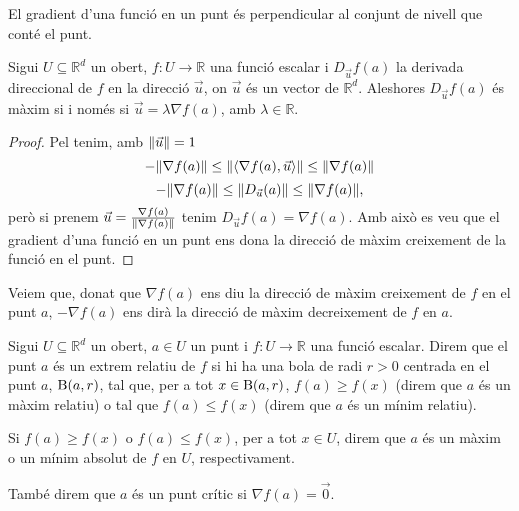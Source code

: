 \documentclass[../Apunts.tex]{subfiles}
\begin{document}
	\begin{observation}\label{obs:gradient ortogonal}
		El gradient d'una funció en un punt és perpendicular al conjunt de nivell que conté el punt.%
	\end{observation}
	\begin{proposition}
		Sigui \(U\subseteq\mathbb{R}^{d}\) un obert, \(f\colon U\to\mathbb{R}\) una funció escalar i \(D_{\vec{u}}f(a)\) la derivada direccional de \(f\) en la direcció \(\vec{u}\), on \(\vec{u}\) és un vector de \(\mathbb{R}^{d}\). Aleshores \(D_{\vec{u}}f(a)\) és màxim si i només si \(\vec{u}=\lambda\nabla f(a)\), amb \(\lambda\in\mathbb{R}\).
		\begin{proof}
			Pel  tenim, amb \(\norm{\vec{u}}=1\)
			\[-\norm{\nabla f(a)}\leq\norm{\langle\nabla f(a),\vec{u}\rangle}\leq\norm{\nabla f(a)}\]
			\[-\norm{\nabla f(a)}\leq\norm{D_{\vec{u}}(a)}\leq\norm{\nabla f(a)},\]
			però si prenem \(\vec{u}=\frac{\nabla f(a)}{\norm{\nabla f(a)}}\) tenim \(D_{\vec{u}}f(a)=\nabla f(a)\). Amb això es veu que el gradient d'una funció en un punt ens dona la direcció de màxim creixement de la funció en el punt.
		\end{proof}
	\end{proposition}
	\begin{observation}
		Veiem que, donat que \(\nabla f(a)\) ens diu la direcció de màxim creixement de \(f\) en el punt \(a\), \(-\nabla f(a)\) ens dirà la direcció de màxim decreixement de \(f\) en \(a\).
	\end{observation}
	\begin{definition}
		\label{def:extrems relatius}
		\label{punts crítics}
		Sigui \(U\subseteq\mathbb{R}^{d}\) un obert, \(a\in U\) un punt i \(f\colon U\to\mathbb{R}\) una funció escalar. Direm que el punt \(a\) és un extrem relatiu de \(f\) si hi ha una bola de radi \(r>0\) centrada en el punt \(a\), \(\operatorname{B}(a,r)\), tal que, per a tot \(x\in\operatorname{B}(a,r)\), \(f(a)\geq f(x)\) (direm que \(a\) és un màxim relatiu) o tal que \(f(a)\leq f(x)\) (direm que \(a\) és un mínim relatiu).
		
		Si \(f(a)\geq f(x)\) o \(f(a)\leq f(x)\), per a tot \(x\in U\), direm que \(a\) és un màxim o un mínim absolut de \(f\) en \(U\), respectivament.
		
		També direm que \(a\) és un punt crític si \(\nabla f(a)=\vec{0}\).
	\end{definition}
\end{document}
